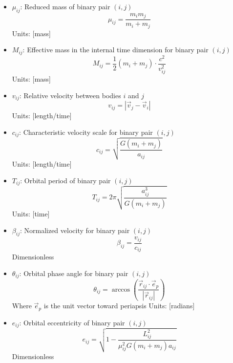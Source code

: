\documentclass{article}
\begin{document}
\begin{itemize}
\item $\mu_{ij}$: Reduced mass of binary pair $(i,j)$
    \begin{equation}
    \mu_{ij} = \frac{m_i m_j}{m_i + m_j}
    \end{equation}
    Units: [mass]

\item $M_{ij}$: Effective mass in the internal time dimension for binary pair $(i,j)$
    \begin{equation}
    M_{ij} = \frac{1}{2}(m_i + m_j) \cdot \frac{c^2}{v_{ij}^2}
    \end{equation}
    Units: [mass]
    
\item $v_{ij}$: Relative velocity between bodies $i$ and $j$
    \begin{equation}
    v_{ij} = |\vec{v}_j - \vec{v}_i|
    \end{equation}
    Units: [length/time]
    
\item $c_{ij}$: Characteristic velocity scale for binary pair $(i,j)$
    \begin{equation}
    c_{ij} = \sqrt{\frac{G(m_i+m_j)}{a_{ij}}}
    \end{equation}
    Units: [length/time]

\item $T_{ij}$: Orbital period of binary pair $(i,j)$
    \begin{equation}
    T_{ij} = 2\pi\sqrt{\frac{a_{ij}^3}{G(m_i+m_j)}}
    \end{equation}
    Units: [time]
    
\item $\beta_{ij}$: Normalized velocity for binary pair $(i,j)$
    \begin{equation}
    \beta_{ij} = \frac{v_{ij}}{c_{ij}}
    \end{equation}
    Dimensionless
    
\item $\theta_{ij}$: Orbital phase angle for binary pair $(i,j)$
    \begin{equation}
    \theta_{ij} = \arccos\left(\frac{\vec{r}_{ij} \cdot \vec{e}_{p}}{|\vec{r}_{ij}|}\right)
    \end{equation}
    Where $\vec{e}_{p}$ is the unit vector toward periapsis
    Units: [radians]
    
\item $e_{ij}$: Orbital eccentricity of binary pair $(i,j)$
    \begin{equation}
    e_{ij} = \sqrt{1 - \frac{L_{ij}^2}{\mu_{ij}^2 G (m_i + m_j) a_{ij}}}
    \end{equation}
    Dimensionless
    

\end{itemize}
\end{document}
